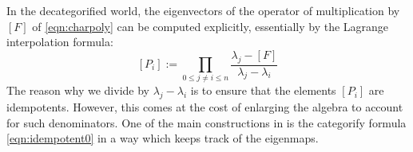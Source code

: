 \documentclass[12pt]{amsart}
\numberwithin{equation}{section}
\newtheorem{theorem}{Theorem}[section]
\theoremstyle{definition}
\newtheorem{definition}[theorem]{Definition}
\theoremstyle{remark}
\DeclareMathOperator{\Id}{Id}
\DeclareMathOperator{\Hom}{Hom}
\newcommand{\cat}{\mathcal{C}}
\renewcommand{\1}{\mathbf{1}}
\newcommand{\e}{\mathrm{End}}
\begin{document}
In the decategorified world, the eigenvectors of the operator of multiplication by $[F]$ of \eqref{eqn:charpoly} can be computed explicitly, essentially by the Lagrange interpolation formula:
\begin{equation}
\label{eqn:idempotent0}
[P_i] := \prod_{0\leq j \neq i \leq n} \frac {\lambda_j - [F]}{\lambda_j-\lambda_i} %
\end{equation}
The reason why we divide by $\lambda_j-\lambda_i$ is to ensure that the elements $[P_i]$ are idempotents. However, this comes at the cost of enlarging the algebra to account for such denominators. One of the main constructions in \cite{EH} is the categorify formula \eqref{eqn:idempotent0} in a way which keeps track of the eigenmaps. %





\end{document}
